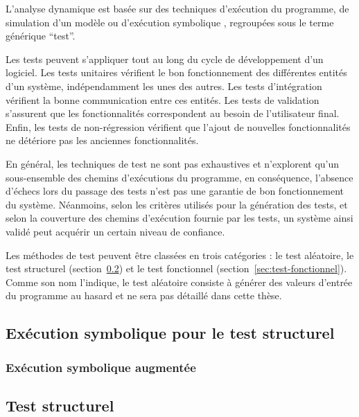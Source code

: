 \documentclass[french]{spimufcphdthesis}
\begin{document}
L’analyse dynamique est basée sur des techniques d’exécution du programme, de
simulation \cite{simulation} d’un modèle ou d'exécution symbolique
\cite{symbolic-execution}, regroupées sous le terme générique ``test''.

Les tests peuvent s’appliquer tout au long du cycle de développement d’un
logiciel. Les tests unitaires vérifient le bon fonctionnement des différentes
entités d’un système, indépendamment les unes des autres. Les tests
d'intégration vérifient la bonne communication entre ces entités. Les tests de
validation s'assurent que les fonctionnalités correspondent au besoin de
l’utilisateur final. Enfin, les tests de non-régression vérifient que l'ajout de
nouvelles fonctionnalités ne détériore pas les anciennes fonctionnalités.

En général, les techniques de test ne sont pas exhaustives et n'explorent qu'un
sous-ensemble des chemins d'exécutions du programme, en conséquence, l’absence
d’échecs lors du passage des tests n’est pas une garantie de bon fonctionnement
du système. Néanmoins, selon les critères utilisés pour la génération des
tests, et selon la couverture des chemins d'exécution fournie par les tests, un
système ainsi validé peut acquérir un certain niveau de confiance.

Les méthodes de test peuvent être classées en trois catégories : le test
aléatoire, le test structurel (section~\ref{sec:test-structurel}) et le test
fonctionnel (section~\ref{sec:test-fonctionnel}). Comme son nom l'indique, le
test aléatoire consiste à générer des valeurs d'entrée du programme au hasard et
ne sera pas détaillé dans cette thèse.



\subsection{Exécution symbolique pour le test structurel}
\label{sec:exec-sym}



\subsubsection{Exécution symbolique augmentée}



\subsection{Test structurel}
\label{sec:test-structurel}
\end{document}
